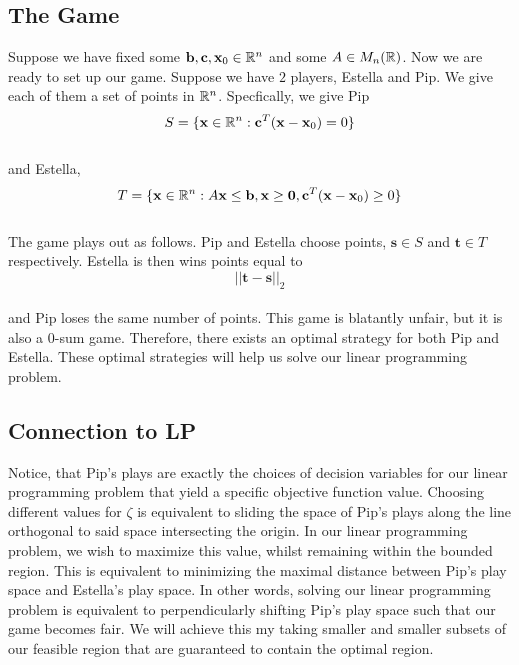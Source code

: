\documentclass[conference]{IEEEtran}
\numberwithin{equation}{section}
\numberwithin{figure}{section}
\theoremstyle{plain}
\theoremstyle{definition}
\newcommand{\R}{\ensuremath \mathbb{R}}
\newcommand{\1}{\ensuremath \mathbbm{1}}
\begin{document}
\subsection{The Game}
Suppose we have fixed some $\mathbf{b},\mathbf{c},\mathbf{x}_0 \in \R^n$ and some 
$A \in M_n(\R)$. Now we are ready to set up our game. Suppose we have $2$ 
players, Estella and Pip. We give each of them a set of points in $\R^n$. 
Specfically, we give Pip \\
\[S = \{\mathbf{x} \in \R^n : \mathbf{c}^T(\mathbf{x} - \mathbf{x}_0) = 0\}\] \\
and Estella, \\
\[T = \{\mathbf{x} \in \R^n : A\mathbf{x} \leq \mathbf{b}, \mathbf{x} \geq 
\mathbf{0}, \mathbf{c}^T(\mathbf{x} - \mathbf{x}_0) \geq 0\}\] \\
The game plays out as follows. Pip and Estella choose points, $\mathbf{s} \in S$ 
and $\mathbf{t} \in T$ respectively. Estella is then wins points equal to \\
\[||\mathbf{t} - \mathbf{s}||_2\] \\
and Pip loses the same number of points. This game is blatantly unfair, but it is 
also a $0$-sum game. Therefore, there exists an optimal strategy for both Pip and 
Estella. These optimal strategies will help us solve our linear programming 
problem. \\

\subsection{Connection to LP}
Notice, that Pip's plays are exactly the choices of decision variables for our 
linear programming problem that yield a specific objective function value. 
Choosing different values for $\zeta$ is equivalent to sliding the space of Pip's 
plays along the line orthogonal to said space intersecting the origin. In our 
linear programming problem, we wish to maximize this value, whilst remaining 
within the bounded region. This is equivalent to minimizing the maximal distance 
between Pip's play space and Estella's play space. In other words, solving our 
linear programming problem is equivalent to perpendicularly shifting Pip's play 
space such that our game becomes fair. We will achieve this my taking smaller and 
smaller subsets of our feasible region that are guaranteed to contain the optimal 
region. \\
\end{document}
